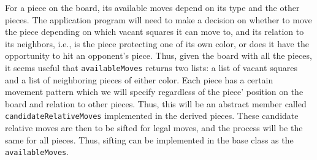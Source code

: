 \documentclass[fsharpnotes.tex]{subfiles}
\begin{document}
For a piece on the board, its available moves depend on its type and the other pieces. The application program will need to make a decision on whether to move the piece depending on which vacant squares it can move to, and its relation to its neighbors, i.e., is the piece protecting one of its own color, or does it have the opportunity to hit an opponent's piece. Thus, given the board with all the pieces, it seems useful that \lstinline{availableMoves} returns two lists: a list of vacant squares and a list of neighboring pieces of either color. Each piece has a certain movement pattern which we will specify regardless of the piece' position on the board and relation to other pieces. Thus, this will be an abstract member called \lstinline{candidateRelativeMoves} implemented in the derived pieces. These candidate relative moves are then to be sifted for legal moves, and the process will be the same for all pieces. Thus, sifting can be implemented in the base class as the \lstinline{availableMoves}.
\end{document}
